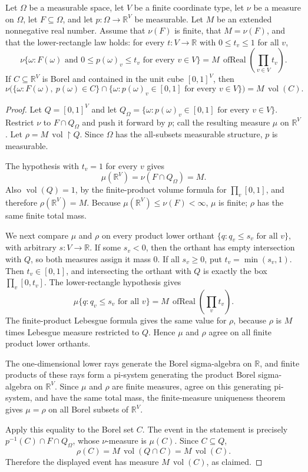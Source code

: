 \begin{helper}
Let \(\Omega\) be a measurable space, let \(V\) be a finite coordinate type,
let \(\nu\) be a measure on \(\Omega\), let \(F\subseteq\Omega\), and let
\(p:\Omega\to\mathbb R^V\) be measurable.  Let \(M\) be an
extended nonnegative real number.  Assume that \(\nu(F)\) is finite, that
\(M=\nu(F)\), and that the lower-rectangle law holds: for every
\(t:V\to\mathbb R\) with \(0\le t_v\le1\) for all \(v\),
\[
\nu\{\omega:F(\omega)\text{ and }0\le p(\omega)_v\le t_v
\text{ for every }v\in V\}
=M\,\operatorname{ofReal}\!\left(\prod_{v\in V}t_v\right).
\]
If \(C\subseteq\mathbb R^V\) is Borel and contained in the unit cube
\([0,1]^V\), then
\[
\nu\bigl(\{\omega:F(\omega),\ p(\omega)\in C\}
\cap\{\omega:p(\omega)_v\in[0,1]\text{ for every }v\in V\}\bigr)
= M\,\operatorname{vol}(C).
\]
\end{helper}
\begin{proof}
Let \(Q=[0,1]^V\) and let
\(Q_\Omega=\{\omega:p(\omega)_v\in[0,1]\text{ for every }v\in V\}\).
Restrict \(\nu\) to \(F\cap Q_\Omega\) and push it forward by \(p\); call
the resulting measure \(\mu\) on \(\mathbb R^V\).  Let
\(\rho=M\,\operatorname{vol}\!\restriction Q\).  Since \(\Omega\) has the
all-subsets measurable structure, \(p\) is measurable.

The hypothesis with \(t_v=1\) for every \(v\) gives
\[
\mu(\mathbb R^V)=\nu(F\cap Q_\Omega)=M.
\]
Also \(\operatorname{vol}(Q)=1\), by the finite-product volume formula for
\(\prod_v[0,1]\), and therefore \(\rho(\mathbb R^V)=M\).  Because
\(\mu(\mathbb R^V)\le\nu(F)<\infty\), \(\mu\) is finite; \(\rho\) has the
same finite total mass.

We next compare \(\mu\) and \(\rho\) on every product lower orthant
\(\{q:q_v\le s_v\text{ for all }v\}\), with arbitrary \(s:V\to\mathbb R\).
If some \(s_v<0\), then the orthant has empty intersection with \(Q\), so
both measures assign it mass \(0\).  If all \(s_v\ge0\), put
\(t_v=\min(s_v,1)\).  Then \(t_v\in[0,1]\), and intersecting the orthant
with \(Q\) is exactly the box \(\prod_v[0,t_v]\).  The lower-rectangle
hypothesis gives
\[
\mu\{q:q_v\le s_v\text{ for all }v\}
=M\,\operatorname{ofReal}\!\left(\prod_v t_v\right).
\]
The finite-product Lebesgue formula gives the same value for
\(\rho\), because \(\rho\) is \(M\) times Lebesgue measure restricted to
\(Q\).  Hence \(\mu\) and \(\rho\) agree on all finite product lower
orthants.

The one-dimensional lower rays generate the Borel sigma-algebra on
\(\mathbb R\), and finite products of these rays form a pi-system generating
the product Borel sigma-algebra on \(\mathbb R^V\).  Since \(\mu\) and
\(\rho\) are finite measures, agree on this generating pi-system, and have
the same total mass, the finite-measure uniqueness theorem gives
\(\mu=\rho\) on all Borel subsets of \(\mathbb R^V\).

Apply this equality to the Borel set \(C\).  The event in the statement is
precisely \(p^{-1}(C)\cap F\cap Q_\Omega\), whose \(\nu\)-measure is
\(\mu(C)\).  Since \(C\subseteq Q\),
\[
\rho(C)=M\,\operatorname{vol}(Q\cap C)=M\,\operatorname{vol}(C).
\]
Therefore the displayed event has measure \(M\,\operatorname{vol}(C)\), as
claimed.
\end{proof}
